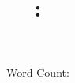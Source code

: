 \title{
  \Huge\bfseries{\reportTitle} \\
  \Large\bfseries{\reportModNumber : \reportModName}
}
\author{
  \reportAuthors \\
}
\date{
  Word Count: \reportWordCount \\ 
  \reportDate
}

\newcommand{\buildtitle}{\maketitle\normalsize}
\newcommand{\authorNameNo}[2]{#1 \textit{(#2)} \\}
\newcommand{\authorName}[1]{#1 \\}

